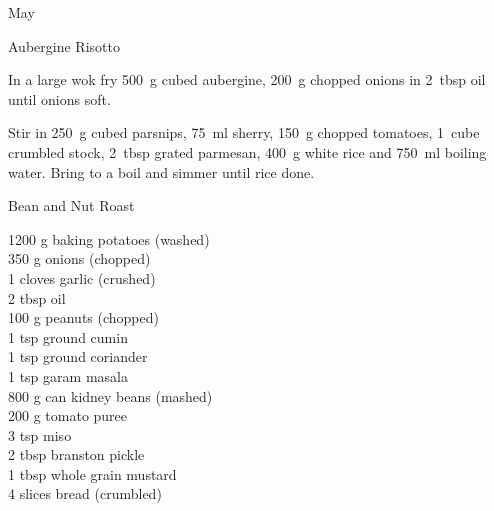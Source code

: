 \begin{menu}{May}
\begin{recipe}{2}{Aubergine Risotto}
\begin{ingredients}
		\end{ingredients}
	
	
    \begin{instructions}
    \item 
        In a large wok fry
        500~g cubed aubergine,
        200~g chopped onions
        in
        2~tbsp  oil
        until onions soft.
      \item 
        Stir in
        250~g cubed parsnips,
        75~ml  sherry,
        150~g chopped tomatoes,
        1~cube crumbled stock,
        2~tbsp grated parmesan,
        400~g  white rice
        and
        750~ml  boiling water.
        Bring to a boil and simmer until rice done.
      
    \end{instructions}
    \end{recipe}%
  
    \begin{recipe}{2}{Bean and Nut Roast}%
		\begin{ingredients}
		1200 g baking potatoes (washed) \\
	350 g onions (chopped) \\
	1 cloves garlic (crushed) \\
	2 tbsp oil  \\
	100 g peanuts (chopped) \\
	1 tsp ground cumin  \\
	1 tsp ground coriander  \\
	1 tsp garam masala  \\
	800 g can kidney beans (mashed) \\
	200 g tomato puree  \\
	3 tsp miso  \\
	2 tbsp branston pickle  \\
	1 tbsp whole grain mustard  \\
	4 slices bread (crumbled) \\
	
		\end{ingredients}
	
	

\end{recipe}
\end{menu}
